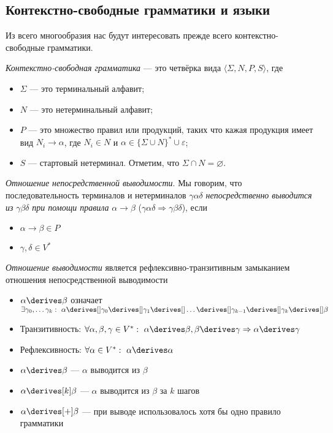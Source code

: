 \subsection{Контекстно-свободные грамматики и языки}

Из всего многообразия нас будут интересовать прежде всего контекстно-свободные грамматики.

\begin{definition}
\textit{Контекстно-свободная грамматика} --- это четвёрка вида $\langle \Sigma, N, P, S \rangle$, где
\begin{itemize}
  \item $\Sigma$ --- это терминальный алфавит;
  \item $N$ --- это нетерминальный алфавит;
  \item $P$ --- это множество правил или продукций, таких что кажая продукция имеет вид $N_i \to \alpha$, где $N_i \in N$ и $\alpha \in \{\Sigma \cup N\}^* \cup {\varepsilon}$;
  \item $S$ --- стартовый нетерминал.
  Отметим, что $\Sigma \cap N = \varnothing$.
\end{itemize}
\end{definition}


\begin{definition}
  \textit{Отношение непосредственной выводимости}. Мы говорим, что последовательность терминалов и нетерминалов $\gamma \alpha \delta$ \textit{непосредственно выводится из} $\gamma \beta \delta$ \textit{при помощи правила} $\alpha \rightarrow \beta$ ($\gamma \alpha \delta \Rightarrow \gamma \beta \delta$), если 
  \begin{itemize}
    \item $\alpha \rightarrow \beta \in P$
    \item $\gamma, \delta \in V^*$
  \end{itemize}

\end{definition}

\begin{definition}
\textit{Отношение выводимости} является рефлексивно-транзитивным замыканием отношения непосредственной выводимости
\begin{itemize}
  \item $\alpha \derives \beta$ означает $\exists \gamma_0, \dots \gamma_k: \ \alpha \derives[] \gamma_0 \derives[] \gamma_1 \derives[] \dots \derives[] \gamma_{k-1} \derives[] \gamma_{k} \derives[] \beta$
  \item Транзитивность: $\forall \alpha, \beta, \gamma \in V^*: \ \alpha \derives \beta, \beta \derives \gamma \Rightarrow \alpha \derives \gamma$
  \item Рефлексивность: $\forall \alpha \in V^*: \ \alpha \derives \alpha$
  \item $\alpha \derives \beta$ --- $\alpha$ выводится из $\beta$
  \item $\alpha \derives[k] \beta$ --- $\alpha$ выводится из $\beta$ за $k$ шагов
  \item $\alpha \derives[+] \beta$ --- при выводе использовалось хотя бы одно правило грамматики
\end{itemize}
\end{definition}

